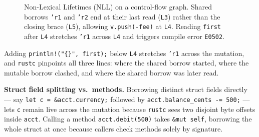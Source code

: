 \begin{figure}[H]
\caption{Non-Lexical Lifetimes (NLL) on a control-flow graph. Shared borrows \texttt{'r1} and \texttt{'r2} end at their last read (\texttt{L3}) rather than the closing brace (\texttt{L5}), allowing \texttt{v.push(-fee)} at \texttt{L4}. Reading \texttt{first} after \texttt{L4} stretches \texttt{'r1} across \texttt{L4} and triggers compile error \texttt{E0502}.}
\label{ch04:fig-nll-timeline}
\end{figure}

Adding \texttt{println!("\{\}", first);} below \texttt{L4} stretches \texttt{'r1} across the mutation, and \texttt{rustc} pinpoints all three lines: where the shared borrow started, where the mutable borrow clashed, and where the shared borrow was later read.

\begin{intuitionbox}
\textbf{Struct field splitting vs.\ methods.} Borrowing distinct struct fields directly --- say \texttt{let c = \&acct.currency;} followed by \texttt{acct.balance\_cents -= 500;} --- lets \texttt{c} remain live across the mutation because \texttt{rustc} sees two disjoint byte offsets inside \texttt{acct}. Calling a method \texttt{acct.debit(500)} takes \texttt{\&mut self}, borrowing the whole struct at once because callers check methods solely by signature.
\end{intuitionbox}

